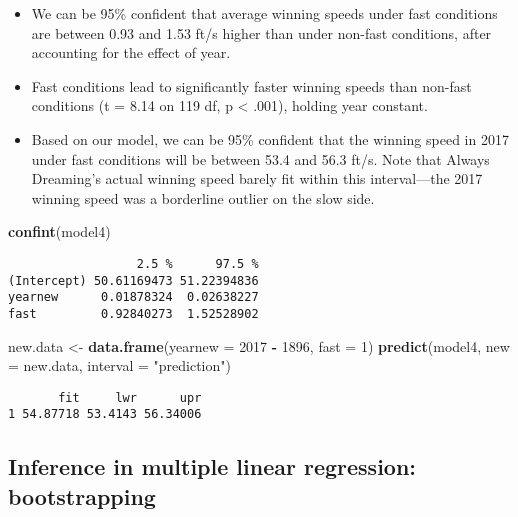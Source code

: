 \documentclass[
]{krantz}
\newenvironment{Shaded}{\begin{snugshade}}{\end{snugshade}}
\newcommand{\DataTypeTok}[1]{\textcolor[rgb]{0.27,0.27,0.27}{#1}}
\newcommand{\DecValTok}[1]{\textcolor[rgb]{0.06,0.06,0.06}{#1}}
\newcommand{\KeywordTok}[1]{\textcolor[rgb]{0.27,0.27,0.27}{\textbf{#1}}}
\newcommand{\NormalTok}[1]{#1}
\newcommand{\OperatorTok}[1]{\textcolor[rgb]{0.43,0.43,0.43}{\textbf{#1}}}
\newcommand{\StringTok}[1]{\textcolor[rgb]{0.5,0.5,0.5}{#1}}
\providecommand{\tightlist}{%
  \setlength{\itemsep}{0pt}\setlength{\parskip}{0pt}}
\begin{document}
\begin{itemize}
\tightlist
\item
  We can be 95\% confident that average winning speeds under fast conditions are between 0.93 and 1.53 ft/s higher than under non-fast conditions, after accounting for the effect of year.
\item
  Fast conditions lead to significantly faster winning speeds than non-fast conditions (t = 8.14 on 119 df, p \textless{} .001), holding year constant.
\item
  Based on our model, we can be 95\% confident that the winning speed in 2017 under fast conditions will be between 53.4 and 56.3 ft/s. Note that Always Dreaming's actual winning speed barely fit within this interval---the 2017 winning speed was a borderline outlier on the slow side.
\end{itemize}

\begin{Shaded}
\begin{Highlighting}[]
\KeywordTok{confint}\NormalTok{(model4)}
\end{Highlighting}
\end{Shaded}

\begin{verbatim}
                  2.5 %      97.5 %
(Intercept) 50.61169473 51.22394836
yearnew      0.01878324  0.02638227
fast         0.92840273  1.52528902
\end{verbatim}

\begin{Shaded}
\begin{Highlighting}[]
\NormalTok{new.data <-}\StringTok{ }\KeywordTok{data.frame}\NormalTok{(}\DataTypeTok{yearnew =} \DecValTok{2017} \OperatorTok{-}\StringTok{ }\DecValTok{1896}\NormalTok{, }\DataTypeTok{fast =} \DecValTok{1}\NormalTok{) }
\KeywordTok{predict}\NormalTok{(model4, }\DataTypeTok{new =}\NormalTok{ new.data, }\DataTypeTok{interval =} \StringTok{"prediction"}\NormalTok{)}
\end{Highlighting}
\end{Shaded}

\begin{verbatim}
       fit     lwr      upr
1 54.87718 53.4143 56.34006
\end{verbatim}

\hypertarget{multreg-boot}{%
\subsection{Inference in multiple linear regression: bootstrapping}\label{multreg-boot}}
\end{document}
